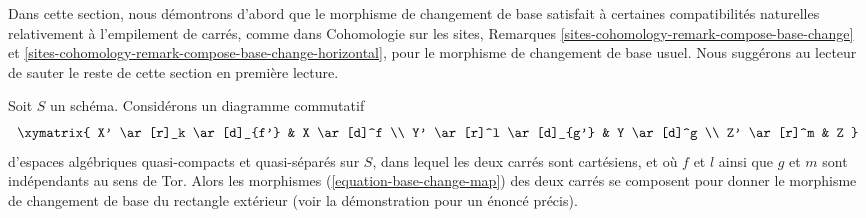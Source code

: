 \medskip\noindent
Dans cette section, nous démontrons d'abord que le morphisme de changement de base satisfait
à certaines compatibilités naturelles relativement à l'empilement de carrés, comme dans
Cohomologie sur les sites, Remarques
\ref{sites-cohomology-remark-compose-base-change} et
\ref{sites-cohomology-remark-compose-base-change-horizontal},
pour le morphisme de changement de base usuel.
Nous suggérons au lecteur de sauter le reste de cette section en première lecture.

\begin{lemma}
\label{lemma-compose-base-change-maps}
Soit $S$ un schéma. Considérons un diagramme commutatif
$$
\xymatrix{
X' \ar[r]_k \ar[d]_{f'} & X \ar[d]^f \\
Y' \ar[r]^l \ar[d]_{g'} & Y \ar[d]^g \\
Z' \ar[r]^m & Z
}
$$
d'espaces algébriques quasi-compacts et quasi-séparés sur $S$, dans lequel
les deux carrés sont cartésiens, et où $f$ et $l$
ainsi que $g$ et $m$ sont indépendants au sens de Tor.
Alors les morphismes (\ref{equation-base-change-map})
des deux carrés se composent pour donner le morphisme de
changement de base du rectangle extérieur (voir la démonstration pour un énoncé précis).
\end{lemma}

